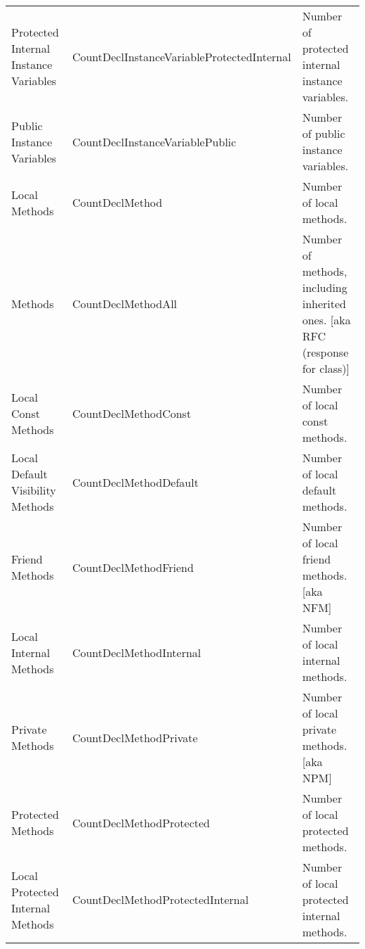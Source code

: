 \begin{table}
\begin{tabular}{p{}p{}p{}}
		Protected Internal Instance Variables & CountDeclInstanceVariable\-ProtectedInternal & Number of protected internal instance variables.\\
		Public Instance Variables & CountDeclInstanceVariable\-Public & Number of public instance variables.\\
		Local Methods & CountDeclMethod & Number of local methods.\\
		Methods & CountDeclMethodAll & Number of methods, including inherited ones. [aka RFC (response for class)]\\
		Local Const Methods & CountDeclMethodConst & Number of local const methods.\\
		Local Default Visibility Methods & CountDeclMethodDefault & Number of local default methods.\\
		Friend Methods & CountDeclMethodFriend & Number of local friend methods. [aka NFM]\\
		Local Internal Methods & CountDeclMethodInternal & Number of local internal methods.\\
		Private Methods & CountDeclMethodPrivate & Number of local private methods. [aka NPM]\\
		Protected Methods & CountDeclMethodProtected & Number of local protected methods.\\
		Local Protected Internal Methods & CountDeclMethodProtected\-Internal & Number of local protected internal methods.\\

	\end{tabular}
\end{table}

